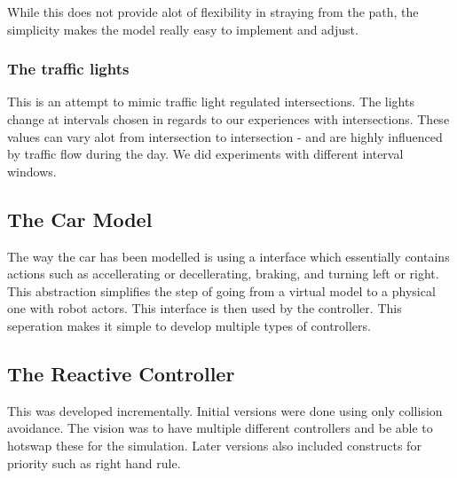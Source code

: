 While this does not provide alot of flexibility in straying from the path, the simplicity makes the model really easy to implement and adjust.

\subsubsection{The traffic lights}
This is an attempt to mimic traffic light regulated intersections.
The lights change at intervals chosen in regards to our experiences with intersections. 
These values can vary alot from intersection to intersection - and are highly influenced by traffic flow during the day. 
We did experiments with different interval windows.


\subsection{The Car Model}
The way the car has been modelled is using a interface which essentially contains actions such as accellerating or decellerating, braking, and turning left or right.
This abstraction simplifies the step of going from a virtual model to a physical one with robot actors.
This interface is then used by the controller. This seperation makes it simple to develop multiple types of controllers.

\subsection{The Reactive Controller}
This was developed incrementally. Initial versions were done using only collision avoidance.
The vision was to have multiple different controllers and be able to hotswap these for the simulation.
Later versions also included constructs for priority such as right hand rule.


